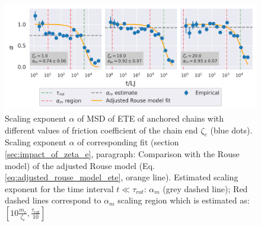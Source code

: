 \documentclass[
    paper=A4,pagesize=automedia,fontsize=12pt,
    BCOR=15mm,DIV=22,
    twoside,headinclude,footinclude=false,
    fleqn,             %
    bibliography=totocnumbered,          %
    listof=totoc,                %
    listof=flat,                 %
    cleardoublepage=empty      %
    numbers=endperiod
]{scrartcl}
\begin{document}
\begin{figure}
    \centering
    \includegraphics[width=\textwidth]{14+15+16-exp-alpha.png}
    \caption{Scaling exponent $\alpha$ of MSD of ETE 
    of anchored chains with different values of
    friction coefficient of the chain end $\zeta_e$ (blue dots).
    Scaling exponent $\alpha$ of corresponding fit 
    (section \ref{sec:impact_of_zeta_e}, 
    paragraph: Comparison with the Rouse model)
    of the adjusted Rouse model (Eq.\ref{eq:adjusted_rouse_model_ete}, 
    orange line). Estimated scaling exponent for the time interval
    $t \ll \tau_{rot}$: $\alpha_m$ (grey dashed line); Red dashed lines
    correspond to $\alpha_m$ scaling region which is estimated as:
    $[10 \frac{m_e}{\zeta_e}, \frac{\tau_{rot}}{10}]$
    }
    \label{fig:alpha_anchored_zeta}
\end{figure}
\end{document}

